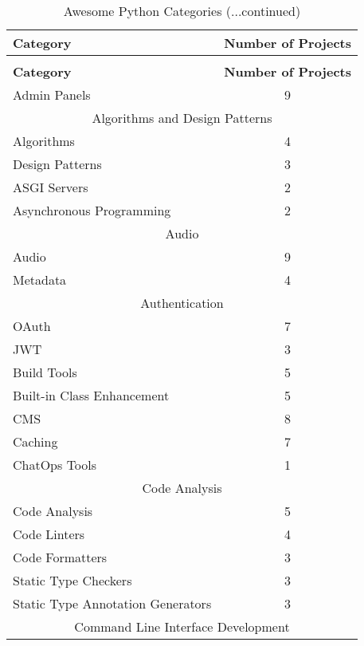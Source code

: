 
\centering
\begin{longtable} {|l|c|}
    \caption[Awesome Python Categories]{Awesome Python Categories \label{table:awesome-python-categories}}\\
    \hline
    \textbf{Category} & \textbf{Number of Projects}\\
    \hline
    \endfirsthead
    \caption[]{Awesome Python Categories (...continued)}\\
    \hline
    \textbf{Category} & \textbf{Number of Projects}\\
    \hline
    \endhead
    \hline
    \endfoot
    Admin Panels & 9\\
    \hline
    \multicolumn{2}{|c|}{Algorithms and Design Patterns}\\
    \hline
    Algorithms & 4\\
    Design Patterns & 3\\
    \hline
    ASGI Servers & 2\\
    \hline
    Asynchronous Programming & 2\\
    \hline
    \multicolumn{2}{|c|}{Audio}\\
    \hline
    Audio & 9\\
    Metadata & 4\\
    \hline
    \multicolumn{2}{|c|}{Authentication}\\
    \hline
    OAuth & 7\\
    JWT & 3\\
    \hline
    Build Tools & 5\\
    \hline
    Built-in Class Enhancement & 5\\
    \hline
    CMS & 8\\
    \hline
    Caching & 7\\
    \hline
    ChatOps Tools & 1\\
    \hline
    \multicolumn{2}{|c|}{Code Analysis}\\
    \hline
    Code Analysis & 5\\
    Code Linters & 4\\
    Code Formatters & 3\\
    Static Type Checkers & 3\\
    Static Type Annotation Generators & 3\\
    \hline
    \multicolumn{2}{|c|}{Command Line Interface Development}\\

\end{longtable}
